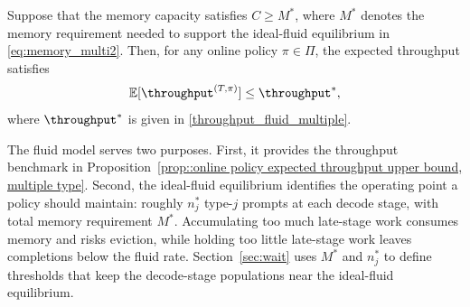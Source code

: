 \begin{proposition}\label{prop::online policy expected throughput upper bound, multiple type}
Suppose that the memory capacity satisfies \(C \geq M^*\), where \(M^*\) denotes the memory requirement needed to support the ideal-fluid equilibrium in \eqref{eq:memory_multi2}. Then, for any online policy \(\pi \in \Pi\), the expected throughput satisfies
\[
\mathbb{E}[\throughput^{(T,\pi)}] \leq \throughput^*,
\]
where \(\throughput^*\) is given in \eqref{throughput_fluid_multiple}.
\end{proposition}
The fluid model serves two purposes. First, it provides the throughput benchmark in Proposition~\ref{prop::online policy expected throughput upper bound, multiple type}. Second, the ideal-fluid equilibrium identifies the operating point a policy should maintain: roughly \(n_j^*\) type-\(j\) prompts at each decode stage, with total memory requirement \(M^*\). Accumulating too much late-stage work consumes memory and risks eviction, while holding too little late-stage work leaves completions below the fluid rate. Section~\ref{sec:wait} uses \(M^*\) and \(n_j^*\) to define thresholds that keep the decode-stage populations near the ideal-fluid equilibrium.







